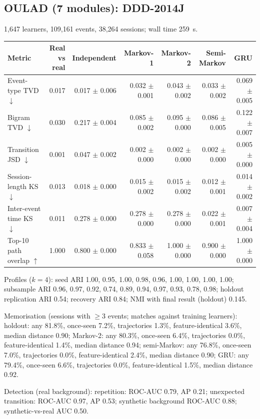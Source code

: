 \subsection*{OULAD (7 modules): DDD-2014J}
1{,}647 learners, 109{,}161 events, 38{,}264 sessions; wall time 259~s.

\begin{tabular}{l r r r r r r }
\toprule
Metric & Real vs real & Independent & Markov-1 & Markov-2 & Semi-Markov & GRU \\
\midrule
Event-type TVD $\downarrow$ & 0.017 & 0.017 $\pm$ 0.006 & 0.032 $\pm$ 0.001 & 0.043 $\pm$ 0.002 & 0.033 $\pm$ 0.002 & 0.069 $\pm$ 0.005 \\
Bigram TVD $\downarrow$ & 0.030 & 0.217 $\pm$ 0.004 & 0.085 $\pm$ 0.002 & 0.095 $\pm$ 0.000 & 0.086 $\pm$ 0.005 & 0.122 $\pm$ 0.007 \\
Transition JSD $\downarrow$ & 0.001 & 0.047 $\pm$ 0.002 & 0.002 $\pm$ 0.000 & 0.002 $\pm$ 0.000 & 0.002 $\pm$ 0.000 & 0.005 $\pm$ 0.000 \\
Session-length KS $\downarrow$ & 0.013 & 0.018 $\pm$ 0.000 & 0.015 $\pm$ 0.002 & 0.015 $\pm$ 0.002 & 0.012 $\pm$ 0.001 & 0.014 $\pm$ 0.002 \\
Inter-event time KS $\downarrow$ & 0.011 & 0.278 $\pm$ 0.000 & 0.278 $\pm$ 0.000 & 0.278 $\pm$ 0.000 & 0.022 $\pm$ 0.001 & 0.007 $\pm$ 0.004 \\
Top-10 path overlap $\uparrow$ & 1.000 & 0.800 $\pm$ 0.000 & 0.833 $\pm$ 0.058 & 1.000 $\pm$ 0.000 & 0.900 $\pm$ 0.000 & 1.000 $\pm$ 0.000 \\
\bottomrule
\end{tabular}

Profiles ($k=4$): seed ARI 1.00, 0.95, 1.00, 0.98, 0.96, 1.00, 1.00, 1.00, 1.00; subsample ARI 0.96, 0.97, 0.92, 0.74, 0.89, 0.94, 0.97, 0.93, 0.78, 0.98; holdout replication ARI 0.54; recovery ARI 0.84; NMI with final result (holdout) 0.145.

Memorisation (sessions with $\geq$3 events; matches against training learners): holdout: any 81.8\%, once-seen 7.2\%, trajectories 1.3\%, feature-identical 3.6\%, median distance 0.90; Markov-2: any 80.3\%, once-seen 6.4\%, trajectories 0.0\%, feature-identical 1.4\%, median distance 0.94; semi-Markov: any 76.8\%, once-seen 7.0\%, trajectories 0.0\%, feature-identical 2.4\%, median distance 0.90; GRU: any 79.4\%, once-seen 6.6\%, trajectories 0.0\%, feature-identical 1.5\%, median distance 0.92.

Detection (real background): repetition: ROC-AUC 0.79, AP 0.21; unexpected transition: ROC-AUC 0.97, AP 0.53; synthetic background ROC-AUC 0.88; synthetic-vs-real AUC 0.50.

